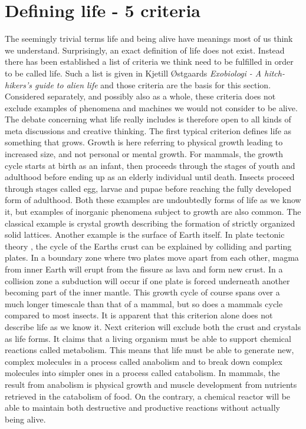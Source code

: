 \section{Defining life - 5 criteria}

The seemingly trivial terms life and being alive have meanings most of us think we understand. Surprisingly, an exact definition of life does not exist. Instead there has been established a list of criteria we think need to be fulfilled in order to be called life. Such a list is given in Kjetill \O stgaards \textit{Exobiologi - A hitch-hikers's guide to alien life} \cite{Exoboken} and those criteria are the basis for this section. Considered separately, and possibly also as a whole, these criteria does not exclude examples of phenomena and machines we would not consider to be alive. The debate concerning what life really includes is therefore open to all kinds of meta
discussions and creative thinking.
The first typical criterion defines life as something that grows. Growth is here referring to physical growth leading to increased size, and not personal or mental growth. For mammals, the growth cycle starts at birth as an infant, then proceeds through the stages of youth and adulthood before ending up as an elderly individual until death. Insects proceed through stages called egg, larvae and pupae before reaching the fully developed form of adulthood. Both these examples are undoubtedly forms of life as we know it, but examples of inorganic phenomena subject to growth are also common. The classical example is crystal growth describing the formation of strictly organized solid lattices. Another example is the surface of Earth itself. In plate tectonic theory \cite{tectonic}, the cycle of the Earths crust can be explained by colliding and parting plates. In a boundary zone where two plates move apart from each other, magma from inner Earth will erupt from the fissure as lava and form new crust. In a collision zone a subduction will occur if one plate is forced underneath another becoming part of the inner mantle. This growth cycle of course spans over a much longer timescale than that of a mammal, but so does a mammals cycle compared to most insects. It is apparent that this criterion alone does not describe life as we know it.
Next criterion will exclude both the crust and crystals as life forms. It claims that a living organism must be able to support chemical reactions called metabolism. This means that life must be able to generate new, complex molecules in a process called anabolism and to break down complex molecules into simpler ones in a process called catabolism. In mammals, the result from anabolism is physical growth and muscle development from nutrients retrieved in the catabolism of food. On the contrary, a chemical reactor will be able to maintain both destructive and productive reactions without actually being alive.
